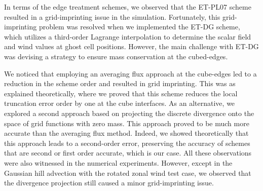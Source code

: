 In terms of the edge treatment schemes, we observed that the ET-PL07 scheme resulted in a 
grid-imprinting issue in the simulation. Fortunately, this grid-imprinting problem was 
resolved when we implemented the ET-DG scheme, which utilizes a third-order Lagrange 
interpolation to determine the scalar field and wind values at ghost cell positions. 
However, the main challenge with ET-DG was devising a strategy to ensure mass 
conservation at the cubed-edges.

We noticed that employing an averaging flux approach at the cube-edges led to a reduction 
in the scheme order and resulted in grid imprinting. This was as explained theoretically, where
we proved that this scheme reduces the local truncation error order by one at the cube interfaces.
As an alternative, we explored a second approach based on projecting the discrete divergence onto the space of grid 
functions with zero mass. This approach proved to be much more accurate than the averaging 
flux method.  Indeed, we showed theoretically that this approach leads to a second-order error, preserving the
accuracy of schemes that are second or first order accurate, which is our case.
All these observations were also witnessed in the numerical experiments.
However, except in the Gaussian hill advection with the rotated zonal wind test case,
we observed that the divergence projection still caused a minor grid-imprinting issue.
\iffalse
\fi

